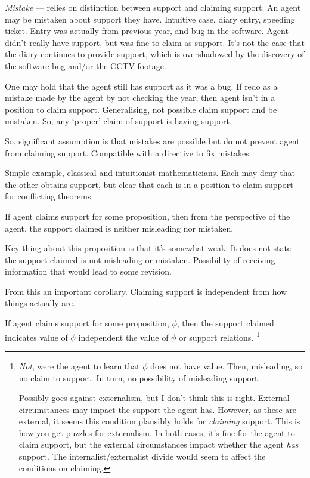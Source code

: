 \begin{note}[Mistaken]
  \emph{Mistake} --- relies on distinction between support and claiming support.
  An agent may be mistaken about support they have.
  Intuitive case, diary entry, speeding ticket.
  Entry was actually from previous year, and bug in the software.
  Agent didn't really have support, but was fine to claim as support.
  It's not the case that the diary continues to provide support, which is overshadowed by the discovery of the software bug and/or the CCTV footage.

  One may hold that the agent still has support as it was a bug.
  If redo as a mistake made by the agent by not checking the year, then agent isn't in a position to claim support.
  Generalising, not possible claim support and be mistaken.
  So, any `proper' claim of support is having support.

  So, significant assumption is that mistakes are possible but do not prevent agent from claiming support.
  Compatible with a directive to fix mistakes.

  Simple example, classical and intuitionist mathematicians.
  Each may deny that the other obtains support, but clear that each is in a position to claim support for conflicting theorems.

  \begin{note}[M \& M]
    If agent claims support for some proposition, then from the perspective of the agent, the support claimed is neither misleading nor mistaken.
  \end{note}

  Key thing about this proposition is that it's somewhat weak.
  It does not state the support claimed is not misleading or mistaken.
  Possibility of receiving information that would lead to some revision.

  From this an important corollary.
  Claiming support is independent from how things actually are.

  \begin{proposition}[\eiS{-} --- \eiS{}]\label{prop:supp:independence}
    If agent claims support for some proposition, \(\phi\), then the support claimed indicates value of \(\phi\) independent the value of \(\phi\) or support relations.\nolinebreak
    \footnote{
      \emph{Not}, were the agent to learn that \(\phi\) does not have value.
      Then, misleading, so no claim to support.
      In turn, no possibility of misleading support.

      Possibly goes against externalism, but I don't think this is right.
      External circumstances may impact the support the agent has.
      However, as these are external, it seems this condition plausibly holds for \emph{claiming} support.
      This is how you get puzzles for externalism.
      In both cases, it's fine for the agent to claim support, but the external circumstances impact whether the agent \emph{has} support.
      The internalist/externalist divide would seem to affect the conditions on claiming.

}
\end{proposition}
\end{note}
